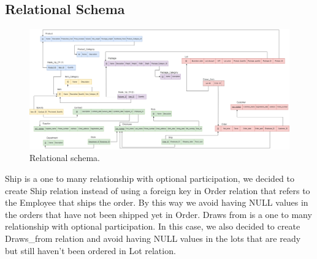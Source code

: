 \subsection{Relational Schema}
\begin{figure}[!h]
	\centering
	\includegraphics[width=1.3\linewidth,angle=270,origin=c]{Relational.png}
	\caption{Relational schema.}
	\label{fig:relational-schema}
\end{figure}
Ship is a one to many relationship with optional participation, we decided to create Ship relation instead of using a foreign key in Order relation that refers to the Employee that ships the order. By this way we avoid having NULL values in the orders that have not been shipped yet in Order.
Draws from is a one to many relationship with optional participation. In this case, we also decided to create Draws\_from relation and avoid having NULL  values in the lots that are ready but still haven't been ordered in Lot relation.
